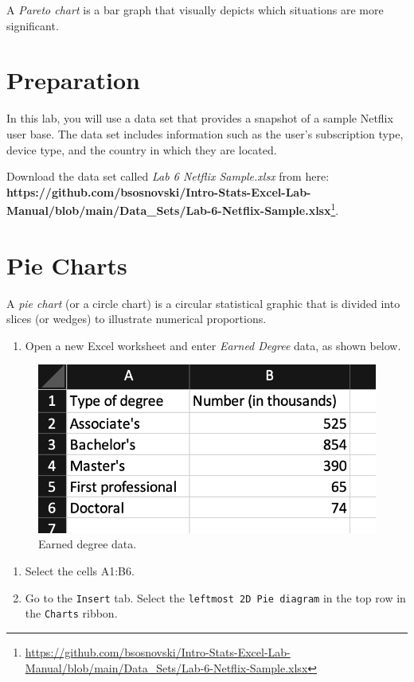 \documentclass[
  12pt,
  letterpaper,
]{book}
\providecommand{\tightlist}{%
  \setlength{\itemsep}{0pt}\setlength{\parskip}{0pt}}
\DeclareRobustCommand{\href}[2]{#2\footnote{\url{#1}}}
\begin{document}
A \emph{Pareto chart} is a bar graph that visually depicts which situations are more significant.

\hypertarget{preparation-3}{%
\section{Preparation}\label{preparation-3}}

In this lab, you will use a data set that provides a snapshot of a sample Netflix user base. The data set includes information such as the user's subscription type, device type, and the country in which they are located.

Download the data set called \emph{Lab 6 Netflix Sample.xlsx} from here: \href{https://github.com/bsosnovski/Intro-Stats-Excel-Lab-Manual/blob/main/Data_Sets/Lab-6-Netflix-Sample.xlsx}{\textbf{https://github.com/bsosnovski/Intro-Stats-Excel-Lab-Manual/blob/main/Data\_Sets/Lab-6-Netflix-Sample.xlsx}}.

\hypertarget{pie-charts}{%
\section{Pie Charts}\label{pie-charts}}

A \emph{pie chart} (or a circle chart) is a circular statistical graphic that is divided into slices (or wedges) to illustrate numerical proportions.

\begin{enumerate}
\def\labelenumi{\arabic{enumi}.}
\tightlist
\item
  Open a new Excel worksheet and enter \emph{Earned Degree} data, as shown below.
\end{enumerate}

\begin{figure}

{\centering \includegraphics[width=0.5\linewidth]{images/degree-earned-data} 

}

\caption{Earned degree data.}\label{fig:degree-earned-data}
\end{figure}

\begin{enumerate}
\def\labelenumi{\arabic{enumi}.}
\setcounter{enumi}{1}
\tightlist
\item
  Select the cells A1:B6.
\item
  Go to the \texttt{Insert} tab. Select the \texttt{leftmost\ 2D\ Pie\ diagram} in the top row in the \texttt{Charts} ribbon.
\end{enumerate}
\end{document}
